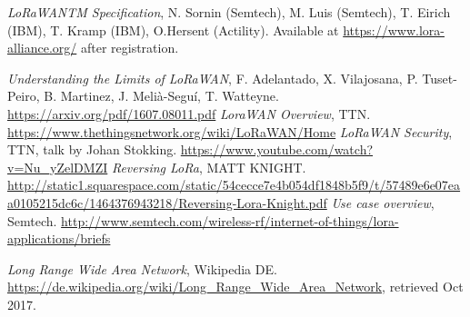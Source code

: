 \begin{thebibliography}{9}

    \textit{LoRaWANTM Specification}, N. Sornin (Semtech), M. Luis (Semtech), T. Eirich (IBM), T. Kramp (IBM), O.Hersent (Actility). Available at \url{https://www.lora-alliance.org/} after registration.

    \textit{Understanding the Limits of LoRaWAN}, F. Adelantado, X. Vilajosana, P. Tuset-Peiro, B. Martinez, J. Melià-Seguí, T. Watteyne. \url{https://arxiv.org/pdf/1607.08011.pdf}
    \textit{LoraWAN Overview}, TTN. \url{https://www.thethingsnetwork.org/wiki/LoRaWAN/Home}
    \textit{LoRaWAN Security}, TTN, talk by Johan Stokking. \url{https://www.youtube.com/watch?v=Nu_yZelDMZI}
    \textit{Reversing LoRa}, MATT KNIGHT. \url{http://static1.squarespace.com/static/54cecce7e4b054df1848b5f9/t/57489e6e07eaa0105215dc6c/1464376943218/Reversing-Lora-Knight.pdf}
    \textit{Use case overview}, Semtech. \url{http://www.semtech.com/wireless-rf/internet-of-things/lora-applications/briefs}


  \textit{Long Range Wide Area Network}, Wikipedia DE. \url{https://de.wikipedia.org/wiki/Long_Range_Wide_Area_Network}, retrieved Oct 2017.

\end{thebibliography}
